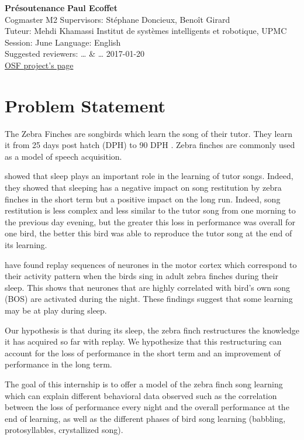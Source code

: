 \documentclass[a4paper]{article}
\begin{document}
\noindent
\large\textbf{Présoutenance} \hfill \textbf{Paul Ecoffet} \\
\normalsize Cogmaster M2 \hfill Supervisors: Stéphane Doncieux, Benoît Girard \\
Tuteur: Mehdi Khamassi \hfill Institut de systèmes intelligents et robotique, UPMC\\
Session: June \hfill Language: English\\
Suggested reviewers: … \& … \hfill 2017-01-20\\
\href{https://osf.io/ja8k9/}{OSF project's page}


\section*{Problem Statement}

The Zebra Finches are songbirds which learn the song of their tutor. They learn
it from 25 days post hatch (DPH) to 90 DPH \parencite{liu_juvenile_2004}. Zebra
finches are commonly used as a model of speech acquisition.

\textcite{deregnaucourt_how_2005} showed that sleep plays an important role in
the learning of tutor songs. Indeed, they showed that sleeping has a negative
impact on song restitution by zebra finches in the short term but a positive
impact on the long run. Indeed, song restitution is less complex and less
similar to the tutor song from one morning to the previous day evening, but the
greater this loss in performance was overall for one bird, the better this bird
was able to reproduce the tutor song at the end of its learning.


\textcite{dave_song_2000} have found replay sequences of neurones in the motor
cortex which correspond to their activity pattern when the birds sing in adult
zebra finches during their sleep. This shows that neurones that are highly
correlated with bird's own song (BOS) are activated during the night. These
findings suggest that some learning may be at play during sleep.

Our hypothesis is that during its sleep, the zebra finch restructures the
knowledge it has acquired so far with replay. We hypothesize that this
restructuring can account for the loss of performance in the short term and an
improvement of performance in the long term.

The goal of this internship is to offer a model of the zebra finch song
learning which can explain different behavioral data observed such as the
correlation between the loss of performance every night and the overall
performance at the end of learning, as well as the different phases of bird song
learning (babbling, protosyllables, crystallized song).
\end{document}
